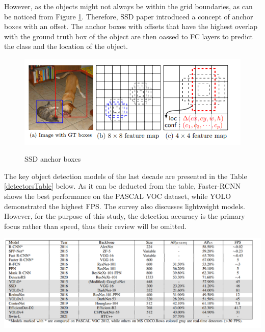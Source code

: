\documentclass[english, 12pt, a4paper, elec, utf8, a-1b, online]{aaltothesis}
\begin{document}
However, as the objects might not always be within the grid boundaries, as can be noticed from Figure \ref{ssd_boxes}. Therefore, SSD paper introduced a concept of anchor boxes with an offset. The anchor boxes with offsets that have the highest overlap with the ground truth box of the object are then oassed to FC layers to predict the class and the location of the object. 

\begin{figure}[htb]
	\begin{center}
		\includegraphics[width=12cm]{./ssd_boxes.png}
	\end{center}
	\caption{SSD anchor boxes\cite{Liu2015}}
	\begin{center}
		\label{ssd_boxes}
	\end{center}
\end{figure}
\FloatBarrier

The key object detection models of the last decade are presented \cite{Zaidi2021}  in the Table \ref{detectorsTable} below. As it can be deducted from the table, Faster-RCNN shows the best performance on the PASCAL VOC dataset, while YOLO demonstrated the highest FPS. The survey \cite{Zaidi2021} also discusses lightweight models. However, for the purpose of this study, the detection accuracy is the primary focus rather than speed, thus their review will be omitted. 

\begin{table}[htb]
	\begin{center}
		\includegraphics[width=16cm]{./detectorsTable.png}
	\end{center}
	\begin{center}
		\label{detectorsTable}
	\end{center}
\end{table}
\FloatBarrier
\end{document}
